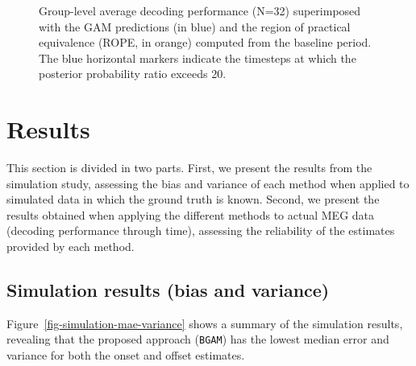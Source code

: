 \documentclass[
  doc,
  floatsintext,
  longtable,
  a4paper,
  nolmodern,
  notxfonts,
  notimes,
  colorlinks=true,linkcolor=blue,citecolor=blue,urlcolor=blue]{apa7}
\begin{document}
\begin{figure}[!htb]

\caption{\label{fig-decoding-data}Group-level average decoding
performance (N=32) superimposed with the GAM predictions (in blue) and
the region of practical equivalence (ROPE, in orange) computed from the
baseline period. The blue horizontal markers indicate the timesteps at
which the posterior probability ratio exceeds 20.}


\end{figure}%

\newpage

\section{Results}\label{results}

This section is divided in two parts. First, we present the results from
the simulation study, assessing the bias and variance of each method
when applied to simulated data in which the ground truth is known.
Second, we present the results obtained when applying the different
methods to actual MEG data (decoding performance through time),
assessing the reliability of the estimates provided by each method.

\subsection{Simulation results (bias and
variance)}\label{simulation-results-bias-and-variance}

Figure~\ref{fig-simulation-mae-variance} shows a summary of the
simulation results, revealing that the proposed approach (\texttt{BGAM})
has the lowest median error and variance for both the onset and offset
estimates.
\end{document}
